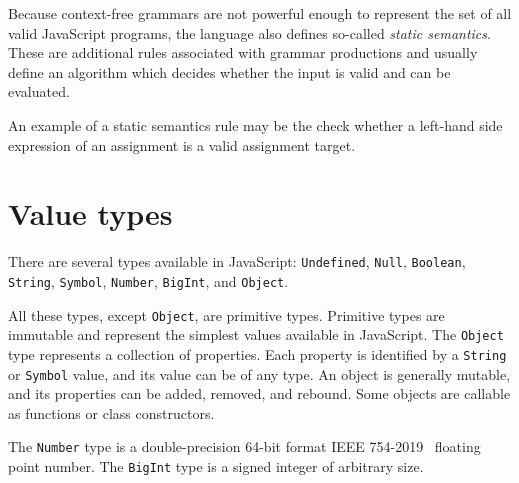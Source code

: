 
Because context-free grammars are not powerful enough to represent the set of all valid JavaScript programs, the language also defines so-called \textit{static semantics}. These are additional rules associated with grammar productions and usually define an algorithm which decides whether the input is valid and can be evaluated.

An example of a static semantics rule may be the check whether a left-hand side expression of an assignment is a valid assignment target.


\section{Value types}\label{lang:types}

There are several types available in JavaScript: \texttt{Undefined}, \texttt{Null}, \texttt{Boolean}, \texttt{String}, \texttt{Symbol}, \texttt{Number}, \texttt{BigInt}, and \texttt{Object}.

All these types, except \texttt{Object}, are primitive types. Primitive types are immutable and represent the simplest values available in JavaScript. The \texttt{Object} type represents a collection of properties. Each property is identified by a \texttt{String} or \texttt{Symbol} value, and its value can be of any type. An object is generally mutable, and its properties can be added, removed, and rebound. Some objects are callable as functions or class constructors.

The \texttt{Number} type is a double-precision 64-bit format IEEE 754-2019~\cite{ieee754} floating point number. The \texttt{BigInt} type is a signed integer of arbitrary size.

